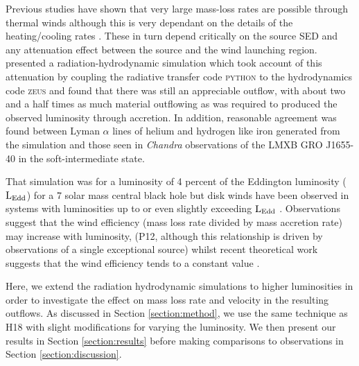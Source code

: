 \documentclass[a4paper,fleqn,usenatbib]{mnras}
\begin{document}
Previous studies have shown that very large mass-loss rates
are possible through thermal winds  \citep{2015ApJ...807..107H} although this is very dependant on the details
 of the heating/cooling rates  \citep{2017ApJ...836...42H}. These 
in turn depend critically on the source SED and any attenuation effect between the source and the wind
launching region. \citet[hereafter H18]{2018MNRAS.479.3651H} presented a radiation-hydrodynamic simulation which 
took account
of this attenuation by coupling the radiative transfer code  \textsc{python} to the hydrodynamics code \textsc{zeus} and 
found that there was still an appreciable outflow, with about two and a half times as much material outflowing as was required
to produced the observed luminosity through accretion. In addition, reasonable agreement was found between 
Lyman $\alpha$ lines of helium and hydrogen like iron generated from the simulation and those seen in \emph{Chandra} 
observations of the LMXB GRO J1655-40 in the soft-intermediate state. 

That simulation was for a luminosity of 4 percent of the Eddington luminosity  ($\rm{L_{Edd}}$) for a 7 solar mass 
central black hole but disk winds have been observed in systems with luminosities up to or even slightly exceeding 
$\rm{L_{Edd}}$ \citep[][herafter P12]{2012MNRAS.422L..11P}.  Observations
suggest that the wind efficiency (mass loss rate divided by mass accretion rate) may increase with luminosity, 
(P12, although this relationship is driven by observations of a single exceptional source) whilst recent theoretical work 
suggests that the wind efficiency tends to a constant value \citep[][hereafter D18]{2018MNRAS.473..838D}.

Here, we extend the radiation hydrodynamic simulations to higher 
luminosities in order to investigate the effect on mass loss rate and velocity in the resulting outflows. 
As discussed in Section \ref{section:method}, we  use the same technique as H18 with slight modifications for varying the luminosity.
We then present our results in Section \ref{section:results} before making comparisons to observations in Section \ref{section:discussion}.
\end{document}
